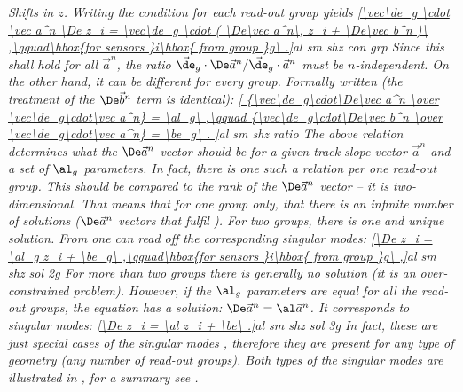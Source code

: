\em{Shifts in $z$}. Writing the condition  for each read-out group yields
\eqref{\vec\de_g \cdot \vec a^n \De z_i = \vec\de_g \cdot (
	\De\vec a^n\, z_i + \De\vec b^n
)\ ,\qquad\hbox{for sensors }i\hbox{ from group }g\ .}{al sm shz con grp}
Since this shall hold for all $\vec a^n$, the ratio $\vec\de_g\cdot\De\vec a^n / \vec\de_g\cdot\vec a^n$ must be $n$-independent. On the other hand, it can be different for every group. Formally written (the treatment of the $\De\vec b^n$ term is identical):
\eqref{
{\vec\de_g\cdot\De\vec a^n \over \vec\de_g\cdot\vec a^n} = \al_g\ ,\qquad
{\vec\de_g\cdot\De\vec b^n \over \vec\de_g\cdot\vec a^n} = \be_g\ .
}{al sm shz ratio}
The above relation determines what the $\De\vec a^n$ vector should be for a given track slope vector $\vec a^n$ and a set of $\al_g$ parameters. In fact, there is one such a relation per one read-out group. This should be compared to the rank of the $\De\vec a^n$ vector -- it is two-dimensional. That means that for one group only, that there is an infinite number of solutions ($\De\vec a^n$ vectors that fulfil ). For two groups, there is one and unique solution. From  one can read off the corresponding singular modes:
\eqref{\De z_i = \al_g z_i + \be_g\ ,\qquad\hbox{for sensors }i\hbox{ from group }g\ ,}{al sm shz sol 2g}
For more than two groups there is generally no solution (it is an over-constrained problem). However, if the $\al_g$ parameters are equal for all the read-out groups, the equation has a solution: $\De\vec a^n = \al \vec a^n$. It corresponds to singular modes:
\eqref{\De z_i = \al z_i + \be\ .}{al sm shz sol 3g}
In fact, these are just special cases of the singular modes , therefore they are present for any type of geometry (any number of read-out groups). Both types of the singular modes are illustrated in , for a summary see .



